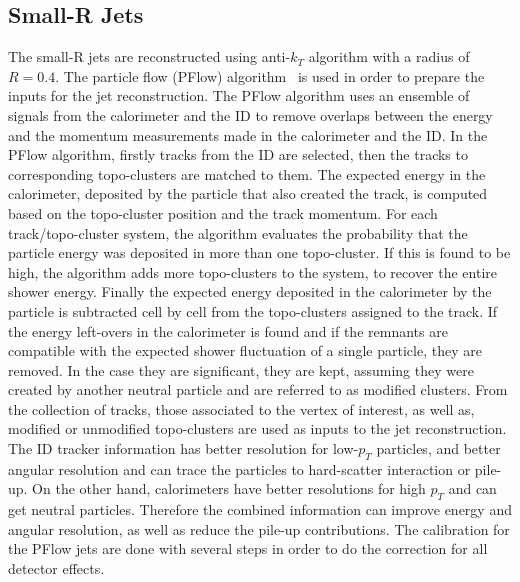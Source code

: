 \subsection{Small-R Jets}
\label{subsec:sRjets}
The small-R jets are reconstructed using anti-$k_T$ algorithm with a radius of $R = 0.4$. The particle flow (PFlow) algorithm~\cite{PERF-2015-09} is used in order to prepare the inputs for the jet reconstruction.
The PFlow algorithm uses an ensemble of signals from the calorimeter and the ID to remove overlaps between the energy and the momentum measurements made in the calorimeter and the ID.
In the PFlow algorithm, firstly tracks from the ID are selected, then the tracks to corresponding topo-clusters are matched to them. 
The expected energy in the calorimeter, deposited by the particle that also created the track, is computed based on the topo-cluster position and the track momentum. For each track/topo-cluster system, the algorithm evaluates the probability that the particle energy was deposited in more than one topo-cluster. If this is found to be high, the algorithm adds more topo-clusters to the system, to recover the entire shower energy.
Finally the expected energy deposited in the calorimeter by the particle is subtracted cell by cell from the topo-clusters assigned to the track.
If the energy left-overs in the calorimeter is found and if the remnants are compatible with the expected shower fluctuation of a single particle, they are removed. In the case they are significant, they are kept, assuming they were created by another neutral particle and are referred to as modified clusters. From the collection of tracks, those associated to the vertex of interest, as well as, modified or unmodified topo-clusters are used as inputs to the jet reconstruction.
The ID tracker information has better resolution for low-$p_T$ particles, and better angular resolution and can trace the particles to hard-scatter
interaction or pile-up. On the other hand, calorimeters have better resolutions for high $p_T$ and can get neutral particles. 
Therefore the combined information can improve energy and angular resolution, as well as reduce the pile-up contributions.
The calibration for the PFlow jets are done with several steps in order to do the correction for all detector effects. 
